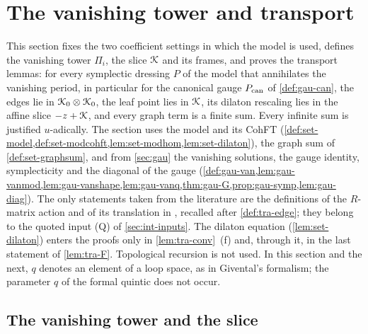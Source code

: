 
\section{The vanishing tower and transport}
\label{sec:tra}

This section fixes the two coefficient settings in which the model is used, defines the vanishing tower $\Pi_i$, the slice $\mathcal{K}$ and its frames, and proves the transport lemmas: for every symplectic dressing $P$ of the model that annihilates the vanishing period, in particular for the canonical gauge $P_{\mathrm{can}}$ of \cref{def:gau-can}, the edges lie in $\mathcal{K}_{0}\otimes\mathcal{K}_{0}$, the leaf point lies in $\mathcal{K}$, its dilaton rescaling lies in the affine slice $-z+\mathcal{K}$, and every graph term is a finite sum. Every infinite sum is justified $u$-adically. The section uses the model and its CohFT (\cref{def:set-model,def:set-modcohft,lem:set-modhom,lem:set-dilaton}), the graph sum of \cref{def:set-graphsum}, and from \cref{sec:gau} the vanishing solutions, the gauge identity, symplecticity and the diagonal of the gauge (\cref{def:gau-van,lem:gau-vanmod,lem:gau-vanshape,lem:gau-vanq,thm:gau-G,prop:gau-symp,lem:gau-diag}). The only statements taken from the literature are the definitions of the $R$-matrix action and of its translation in \cite[Def.~2.2, Prop.~2.12, Def.~2.13]{PPZ15}, recalled after \cref{def:tra-edge}; they belong to the quoted input (Q) of \cref{sec:int-inputs}. The dilaton equation (\cref{lem:set-dilaton}) enters the proofs only in \cref{lem:tra-conv}~(f) and, through it, in the last statement of \cref{lem:tra-F}. Topological recursion is not used. In this section and the next, $q$ denotes an element of a loop space, as in Givental's formalism; the parameter $q$ of the formal quintic does not occur.

\subsection{The vanishing tower and the slice}
\label{sec:tra-tower}

